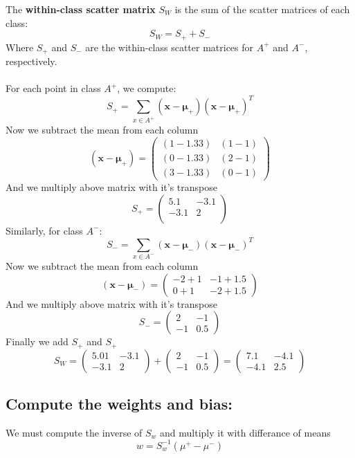 \documentclass[a4paper, 11pt]{article}
\begin{document}
	The \textbf{within-class scatter matrix} \( S_W \) is the sum of the scatter matrices of each class:
	\[
	S_W = S_+ + S_-
	\]
	Where \( S_+ \) and \( S_- \) are the within-class scatter matrices for \( A^+ \) and \( A^- \), respectively.
	\\\\
	For each point in class \( A^+ \), we compute:
	\[
	S_+ = \sum_{x \in A^+} (\mathbf{x} - \mathbf{\mu}_+)(\mathbf{x} - \mathbf{\mu}_+)^T
	\]
	Now we subtract the mean from each column
	\[
	(\mathbf{x} - \mathbf{\mu}_+) =
	\begin{pmatrix} 
		(1-1.33) & (1-1) \\ 
		(0-1.33) & (2-1) \\
		(3-1.33) & (0-1)
	 \end{pmatrix}
	\]
	And we multiply above matrix with it's transpose
	\[
	S_+ =
	\begin{pmatrix} 
		5.1 & -3.1 \\ 
		-3.1 & 2 \\
	\end{pmatrix}
	\]
	Similarly, for class \( A^- \):
	\[
	S_- = \sum_{x \in A^-} (\mathbf{x} - \mathbf{\mu}_-)(\mathbf{x} - \mathbf{\mu}_-)^T
	\]
	Now we subtract the mean from each column
	\[
	(\mathbf{x} - \mathbf{\mu}_-) =  
	\begin{pmatrix} 
		-2+1 & -1+1.5 \\
		0+1 & -2+1.5
	\end{pmatrix}
	\]
	And we multiply above matrix with it's transpose
	\[
	S_- = 
	\begin{pmatrix} 
		2 & -1 \\
		-1 & 0.5
	\end{pmatrix}
	\]
	Finally we add \(S_+\) and \(S_+\)
	\[
	S_W =  
	\begin{pmatrix} 
		5.01 & -3.1 \\
		-3.1 & 2
	\end{pmatrix}
	+
	\begin{pmatrix} 
		2 & -1 \\
		-1 & 0.5
	\end{pmatrix}
	=
	\begin{pmatrix} 
		7.1 & -4.1 \\
		-4.1 & 2.5
	\end{pmatrix}
	\]
	\subsection*{Compute the weights and bias:}
	We must compute the inverse of \(S_w\) and multiply it with differance of means
	\[
	w = S^{-1}_w(\mu^+ - \mu^-)
	\]
	
\end{document}
